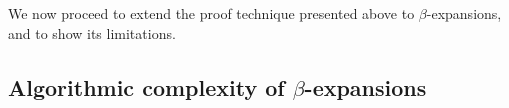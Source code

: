 
We now proceed to extend the proof technique presented above to $\beta$-expansions, and to show its limitations.

\subsection{\texorpdfstring{Algorithmic complexity of $\beta$-expansions}{}}


